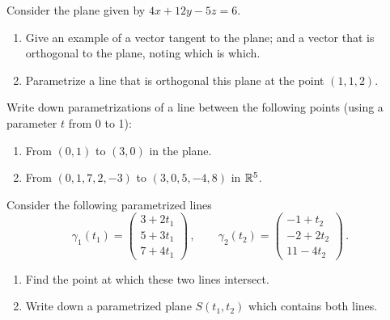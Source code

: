 \documentclass[12pt]{amsart}
\begin{document}
\begin{problem}
    Consider the plane given by $4x + 12y - 5z = 6$.
    \begin{enumerate}
        \item Give an example of a vector tangent to the plane;
            and a vector that is orthogonal to the plane, noting which is which.
        \item Parametrize a line that is orthogonal this plane at 
            the point $(1,1,2)$.
    \end{enumerate}
\end{problem}

\begin{problem}
    Write down parametrizations of a line between the following
    points (using a parameter $t$ from 0 to 1):
    \begin{enumerate}
        \item From $(0,1)$ to $(3,0)$ in the plane.
        \item From $(0,1,7,2,-3)$ to $(3,0,5,-4,8)$ in $\mathbb{R}^5$.
    \end{enumerate}
\end{problem}

\begin{problem}
    Consider the following parametrized lines
    \begin{equation*}
        \gamma_1(t_1)  = \begin{pmatrix}
            3 + 2t_1 \\ 5 + 3t_1 \\ 7 + 4t_1
        \end{pmatrix} \,, \qquad
        \gamma_2 (t_2) = \begin{pmatrix}
            -1 + t_2 \\ -2 + 2t_2 \\ 11 - 4t_2 
        \end{pmatrix} \,.
    \end{equation*}
    \begin{enumerate}
        \item Find the point at which these two lines intersect.
        \item Write down a parametrized plane $S(t_1, t_2)$
            which contains both lines.
    \end{enumerate}
\end{problem}

\printbibliography 
%
%
\end{document}

